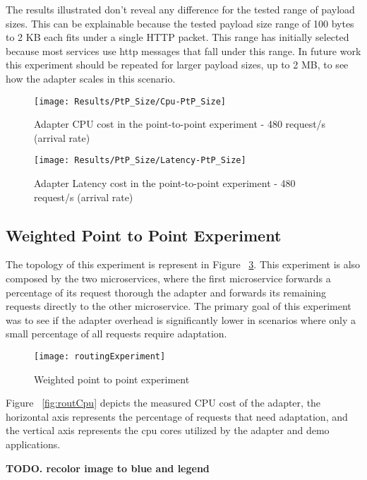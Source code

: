 The results illustrated don't reveal any difference for the tested range of payload sizes.
This can be explainable because the tested payload size range of 100 bytes to 2 KB each fits under a single HTTP packet.
This range has initially selected because most services use http messages that fall under this range.
In future work this experiment should be repeated for larger payload sizes, up to 2 MB, to see how the adapter scales in this scenario.

\begin{figure}[htbp]
    \centering
    \texttt{[image: Results/PtP\_Size/Cpu-PtP\_Size]}
    \caption{Adapter CPU cost in the point-to-point experiment - 480 request/s (arrival rate)}
    \label{fig:payloadCpuPtP}
\end{figure}

\begin{figure}[htbp]
    \centering
    \texttt{[image: Results/PtP\_Size/Latency-PtP\_Size]}
    \caption{Adapter Latency cost in the point-to-point experiment - 480 request/s (arrival rate)}
    \label{fig:payloadLatPtP}
\end{figure}

\subsection{Weighted Point to Point Experiment}

The topology of this experiment is represent in Figure ~\ref{fig:routExp}.
This experiment is also composed by the two microservices, where the first microservice forwards a percentage of its request thorough the adapter
and forwards its remaining requests directly to the other microservice.
The primary goal of this experiment was to see if the adapter overhead is significantly lower in scenarios where only a small percentage of all requests require adaptation.

\begin{figure}[htbp]
    \centering
    \texttt{[image: routingExperiment]}
    \caption{Weighted point to point experiment}
    \label{fig:routExp}
\end{figure}

Figure ~\ref{fig:routCpu} depicts the measured CPU cost of the adapter, the horizontal axis represents the percentage of requests that need adaptation, and the vertical axis represents the
cpu cores utilized by the adapter and demo applications.

\textbf{TODO. recolor image to blue and legend}

